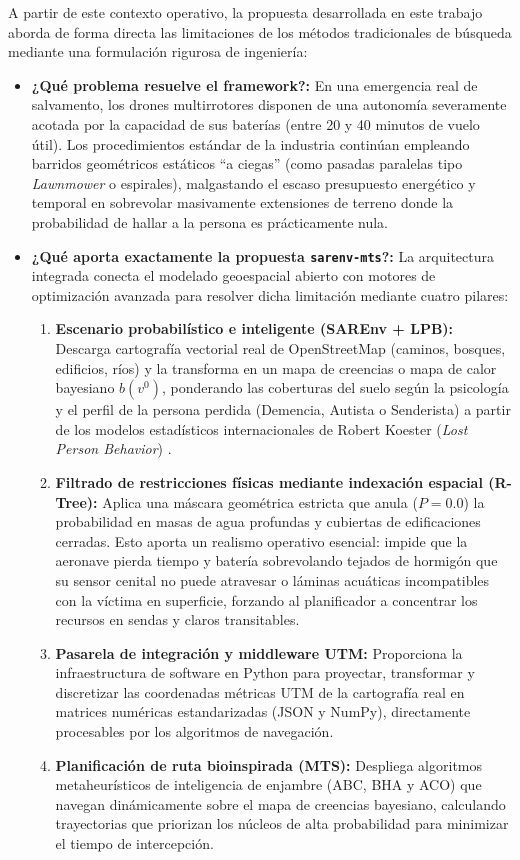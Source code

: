 A partir de este contexto operativo, la propuesta desarrollada en este trabajo aborda de forma directa las limitaciones de los métodos tradicionales de búsqueda mediante una formulación rigurosa de ingeniería:

\begin{itemize}
    \item \textbf{¿Qué problema resuelve el framework?:} En una emergencia real de salvamento, los drones multirrotores disponen de una autonomía severamente acotada por la capacidad de sus baterías (entre 20 y 40 minutos de vuelo útil). Los procedimientos estándar de la industria continúan empleando barridos geométricos estáticos ``a ciegas'' (como pasadas paralelas tipo \textit{Lawnmower} o espirales), malgastando el escaso presupuesto energético y temporal en sobrevolar masivamente extensiones de terreno donde la probabilidad de hallar a la persona es prácticamente nula.
    
    \item \textbf{¿Qué aporta exactamente la propuesta \texttt{sarenv-mts}?:} La arquitectura integrada conecta el modelado geoespacial abierto con motores de optimización avanzada para resolver dicha limitación mediante cuatro pilares:
    \begin{enumerate}
        \item \textbf{Escenario probabilístico e inteligente (SAREnv + LPB):} Descarga cartografía vectorial real de OpenStreetMap (caminos, bosques, edificios, ríos) y la transforma en un mapa de creencias o mapa de calor bayesiano $b(v^0)$, ponderando las coberturas del suelo según la psicología y el perfil de la persona perdida (Demencia, Autista o Senderista) a partir de los modelos estadísticos internacionales de Robert Koester (\textit{Lost Person Behavior}) \cite{koester2008lost}.
        \item \textbf{Filtrado de restricciones físicas mediante indexación espacial (R-Tree):} Aplica una máscara geométrica estricta que anula ($P = 0.0$) la probabilidad en masas de agua profundas y cubiertas de edificaciones cerradas. Esto aporta un realismo operativo esencial: impide que la aeronave pierda tiempo y batería sobrevolando tejados de hormigón que su sensor cenital no puede atravesar o láminas acuáticas incompatibles con la víctima en superficie, forzando al planificador a concentrar los recursos en sendas y claros transitables.
        \item \textbf{Pasarela de integración y middleware UTM:} Proporciona la infraestructura de software en Python para proyectar, transformar y discretizar las coordenadas métricas UTM de la cartografía real en matrices numéricas estandarizadas (JSON y NumPy), directamente procesables por los algoritmos de navegación.
        \item \textbf{Planificación de ruta bioinspirada (MTS):} Despliega algoritmos metaheurísticos de inteligencia de enjambre (ABC, BHA y ACO) que navegan dinámicamente sobre el mapa de creencias bayesiano, calculando trayectorias que priorizan los núcleos de alta probabilidad para minimizar el tiempo de intercepción.
    \end{enumerate}
    

\end{itemize}
